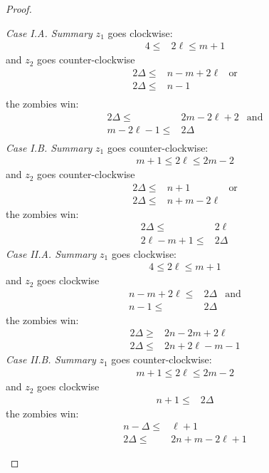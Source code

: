 \begin{proof}
\begin{proofpart}
  \textit{Case I.A. Summary}
  $z_1$ goes clockwise:
  \begin{align*}
   4 \leq & 2 \ell \leq m + 1
  \end{align*}
  and $z_2$ goes counter-clockwise
  \begin{align*}
   2 \Delta \leq & n - m + 2\ell & \text{or} \\
   2 \Delta \leq & n - 1                     \\
  \end{align*}
  the zombies win:
  \begin{align*}
   2 \Delta \leq      & 2 m- 2 \ell + 2 & \text{and} \\
   m - 2\ell  -1 \leq & 2 \Delta                     \\
  \end{align*}
  \textit{Case I.B. Summary}
  $z_1$ goes counter-clockwise:
  \begin{align*}
   m + 1 \leq 2 \ell \leq 2m - 2
  \end{align*}
  and $z_2$ goes counter-clockwise
  \begin{align*}
   2 \Delta \leq & n + 1         & \text{or} \\
   2 \Delta \leq & n + m - 2\ell
  \end{align*}
  the zombies win:
  \begin{align*}
   2 \Delta \leq      & 2 \ell   \\
   2\ell - m + 1 \leq & 2 \Delta
  \end{align*}
  \textit{Case II.A. Summary}
  $z_1$ goes clockwise:
  \begin{align*}
   4 \leq 2 \ell \leq m + 1
  \end{align*}
  and $z_2$ goes clockwise
  \begin{align*}
   n -m + 2\ell \leq & 2 \Delta & \text{and} \\
   n-1 \leq          & 2 \Delta
  \end{align*}
  the zombies win:
  \begin{align*}
   2 \Delta \geq & 2n - 2m + 2\ell    \\
   2 \Delta \leq & 2n + 2\ell - m - 1
  \end{align*}
  \textit{Case II.B. Summary}
  $z_1$ goes counter-clockwise:
  \begin{align*}
   m + 1 \leq 2 \ell \leq 2m - 2
  \end{align*}
  and $z_2$ goes clockwise
  \begin{align*}
   n+1 \leq & 2 \Delta
  \end{align*}
  the zombies win:
  \begin{align*}
   n - \Delta \leq & \ell + 1           \\
   2 \Delta \leq   & 2n + m - 2\ell + 1
  \end{align*}


\end{proofpart}
\end{proof}

